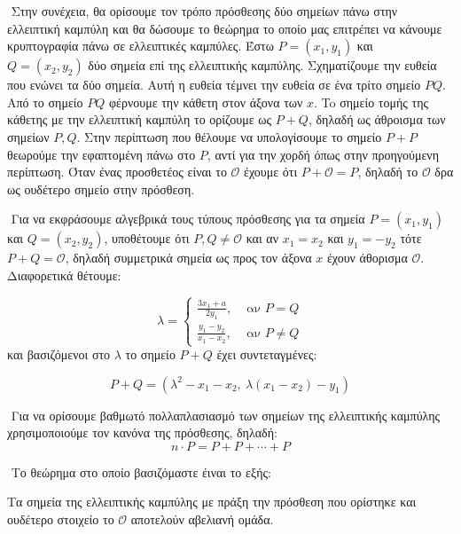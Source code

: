 \documentclass[oneside,a4paper]{article}
\begin{document}
$ $\newline
Στην συνέχεια, θα ορίσουμε τον τρόπο πρόσθεσης δύο σημείων πάνω στην ελλειπτική καμπύλη και θα δώσουμε το θεώρημα το οποίο μας επιτρέπει να κάνουμε κρυπτογραφία πάνω σε ελλειπτικές καμπύλες. Έστω $P=(x_1,y_1)$ και $Q = (x_2,y_2)$ δύο σημεία επί της ελλειπτικής καμπύλης. Σχηματίζουμε την ευθεία που ενώνει τα δύο σημεία. Αυτή η ευθεία τέμνει την ευθεία σε ένα τρίτο σημείο $PQ$. Από το σημείο $PQ$ φέρνουμε την κάθετη στον άξονα των $x$. To σημείο τομής της κάθετης με την ελλειπτική καμπύλη το ορίζουμε ως $P+Q$, δηλαδή ως άθροισμα των σημείων $P, Q$. Στην περίπτωση που θέλουμε να υπολογίσουμε το σημείο $P+P$ θεωρούμε την εφαπτομένη πάνω στο $P$, αντί για την χορδή όπως στην προηγούμενη περίπτωση. Όταν ένας προσθετέος είναι το $\mathcal{O}$ έχουμε ότι $P+\mathcal{O} = P$, δηλαδή το $\mathcal{O}$ δρα ως ουδέτερο σημείο στην πρόσθεση.

$ $\newline
Για να εκφράσουμε αλγεβρικά τους τύπους πρόσθεσης για τα σημεία $P =  (x_1,y_1)$ και $Q= (x_2,y_2)$, υποθέτουμε ότι $P,Q \neq \mathcal{O}$ και αν $x_1 = x_2$ και $y_1 = -y_2$ τότε $P+Q = \mathcal{O}$, δηλαδή συμμετρικά σημεία ως προς τον άξονα $x$ έχουν άθορισμα $\mathcal{O}$. Διαφορετικά θέτουμε:

$$\lambda = 
\begin{cases}\frac{3x_1 + a }{2y_1}, & \text{ αν } P = Q \\
\frac{y_1 -y_2}{x_1 - x_2}, & \text{ αν } P \neq Q \end{cases}$$
και βασιζόμενοι στο $\lambda$ το σημείο $P+Q$ έχει συντεταγμένες:

$$P+Q = (\lambda^2 -x_1 -x_2, \ \lambda(x_1- x_2) -y_1)$$


$ $\newline
Για να ορίσουμε βαθμωτό πολλαπλασιασμό των σημείων της ελλειπτικής καμπύλης χρησιμοποιούμε τον κανόνα της πρόσθεσης, δηλαδή:
$$n \cdot P = P + P + \cdots + P$$

$ $\newline
Το θεώρημα στο οποίο βασιζόμαστε έιναι το εξής:

\begin{theorem} Τα σημεία της ελλειπτικής καμπύλης με πράξη την πρόσθεση που ορίστηκε και ουδέτερο στοιχείο το $\mathcal{O}$ αποτελούν αβελιανή ομάδα.
\end{theorem}
\end{document}
